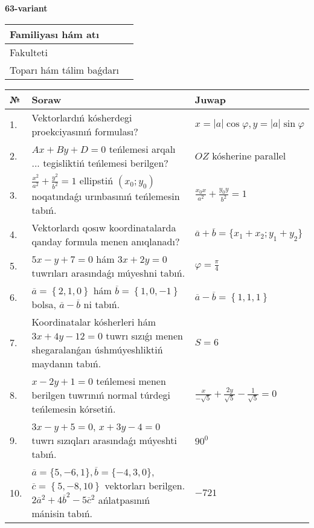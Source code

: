 \documentclass{article}
\begin{document}
\egroup

\newpage


\textbf{63-variant}\\

\bgroup
\def\arraystretch{1.6} %

\begin{tabular}{|m{5.7cm}|m{9.5cm}|}
\hline
Familiyası hám atı & \\
\hline
Fakulteti  & \\
\hline
Toparı hám tálim baǵdarı  & \\
\hline
\end{tabular}

\vspace{1cm}

\begin{tabular}{|m{0.7cm}|m{10cm}|m{4cm}|}
\hline
№ & Soraw & Juwap \\
\hline
1. & Vektorlardıń kósherdegi proekciyasınıń formulası? & $x=|a|\cos\varphi, y=|a|\sin\varphi$ \\
\hline
2. & $Ax+By+D=0$ teńlemesi arqalı ... tegisliktiń teńlemesi berilgen? & $OZ$ kósherine parallel \\
\hline
3. & $\frac{x^2}{a^2}+\frac{y^2}{b^2}=1$ ellipstiń $(x_0;y_0)$ noqatındaǵı urınbasınıń teńlemesin tabıń. & $\frac{x_0x}{a^2}+\frac{y_0y}{b^2}=1$ \\
\hline
4. & Vektorlardı qosıw koordinatalarda qanday formula menen anıqlanadı? & $\overline{a}+\overline{b}=\{x_1+x_2;y_1+y_2\}$ \\
\hline
5. & $5x-y+7=0$ hám $3x+2y=0$ tuwrıları arasındaǵı múyeshni tabıń. & $\varphi=\frac{\pi}{4}$ \\
\hline
6. & $\overline{a}=\left\{ 2, 1, 0 \right\}$ hám $\overline{b}=\left\{ 1, 0,-1 \right\}$ bolsa, $\overline{a}-\overline{b}$ ni tabıń. & $\overline{a} -\overline{b} = \left\{ 1,1,1 \right\}$ \\
\hline
7. & Koordinatalar kósherleri hám $ 3x+4y-12=0 $ tuwrı sızıǵı menen shegaralanǵan úshmúyeshliktiń maydanın tabıń. & $ S=6 $ \\
\hline
8. & $x-2y+1=0$ teńlemesi menen berilgen tuwrınıń normal túrdegi teńlemesin kórsetiń. & $\frac{x}{- \sqrt{5}}+\frac{2y}{\sqrt{5}}-\frac{1}{\sqrt{5}}=0$ \\
\hline
9. & $3x-y+5=0$, $x+3y-4=0$ tuwrı sızıqları arasındaǵı múyeshti tabıń. & $90^{0}$ \\
\hline
10. & $\overline{a}=\{5,-6, 1 \}, \overline{b}=\{-4, 3, 0 \} $, $\overline{c}=\left\{ 5,-8, 10 \right\}$ vektorları berilgen. $2{\overline{a}}^{2}+4{\overline{b}}^{2}-5{\overline{c}}^{2}$ ańlatpasınıń mánisin tabıń. & $-721$ \\
\hline
\end{tabular}
\end{document}
